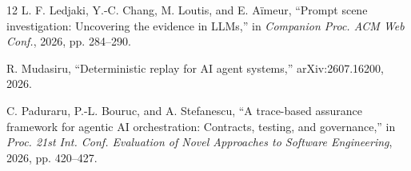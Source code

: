 \documentclass[conference,a4paper]{IEEEtran}
\begin{document}
\begin{thebibliography}{12}
L. F. Ledjaki, Y.-C. Chang, M. Loutis, and E. A\"imeur, ``Prompt scene investigation: Uncovering the evidence in LLMs,'' in \emph{Companion Proc. ACM Web Conf.}, 2026, pp. 284--290.

R. Mudasiru, ``Deterministic replay for AI agent systems,'' arXiv:2607.16200, 2026.

C. Paduraru, P.-L. Bouruc, and A. Stefanescu, ``A trace-based assurance framework for agentic AI orchestration: Contracts, testing, and governance,'' in \emph{Proc. 21st Int. Conf. Evaluation of Novel Approaches to Software Engineering}, 2026, pp. 420--427.
\end{thebibliography}
\end{document}
